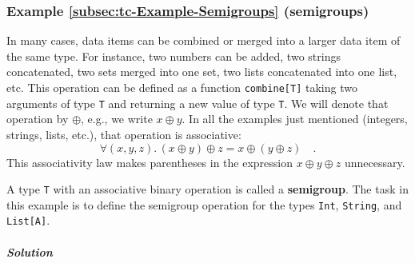 \subsubsection{Example \label{subsec:tc-Example-Semigroups}\ref{subsec:tc-Example-Semigroups}
(semigroups)}

In many cases, data items can be combined or merged into a larger
data item of the same type. For instance, two numbers can be added,
two strings concatenated, two sets merged into one set, two lists
concatenated into one list, etc. This operation can be defined as
a function \lstinline!combine[T]! taking two arguments of type \lstinline!T!
and returning a new value of type \lstinline!T!. We will denote that
operation by $\oplus$, e.g., we write $x\oplus y$. In all the examples
just mentioned (integers, strings, lists, etc.), that operation is
associative:
\begin{equation}
\forall(x,y,z).\,\left(x\oplus y\right)\oplus z=x\oplus\left(y\oplus z\right)\quad.\label{eq:associativity-law-semigroup}
\end{equation}
This associativity law makes
parentheses in the expression $x\oplus y\oplus z$ unnecessary.

A type \lstinline!T! with an associative binary operation is called
a \textbf{semigroup}.
The task in this example is to define the semigroup operation for
the types \lstinline!Int!, \lstinline!String!, and \lstinline!List[A]!.

\subparagraph{Solution}

